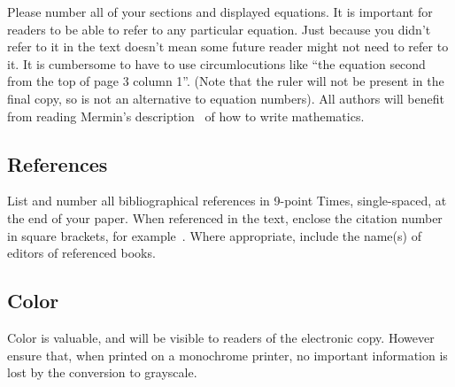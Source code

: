 \documentclass{bmvc2k}
\begin{document}
Please number all of your sections and displayed equations.  It is
important for readers to be able to refer to any particular equation.  Just
because you didn't refer to it in the text doesn't mean some future reader
might not need to refer to it.  It is cumbersome to have to use
circumlocutions like ``the equation second from the top of page 3 column
1''.  (Note that the ruler will not be present in the final copy, so is not
an alternative to equation numbers).  All authors will benefit from reading
Mermin's description~\cite{Mermin89} of how to write mathematics.


\subsection{References}

List and number all bibliographical references in 9-point Times,
single-spaced, at the end of your paper. When referenced in the text,
enclose the citation number in square brackets, for
example~\cite{Authors06}.  Where appropriate, include the name(s) of
editors of referenced books.


\subsection{Color}

Color is valuable, and will be visible to readers of the electronic copy.
However ensure that, when printed on a monochrome printer, no important
information is lost by the conversion to grayscale.


\end{document}
